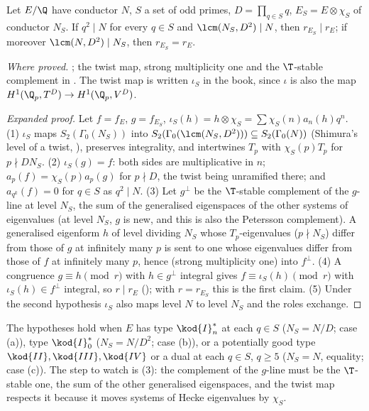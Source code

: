 \begin{sloppypar}
\begin{theorem}\label{thm:paper:twist}
Let $E/\Q$ have conductor $N$, $S$ a set of odd primes, $D=\prod_{q\in S}q$, $E_S=E\otimes\chi_S$ of conductor $N_S$. If $q^2\mid N$ for every $q\in S$ and $\lcm(N_S,D^2)\mid N$, then $r_{E_S}\mid r_E$;
if moreover $\lcm(N,D^2)\mid N_S$, then $r_{E_S}=r_E$.
\end{theorem}

\noindent\emph{Where proved.} ; the twist map, strong multiplicity one and the $\T$-stable complement in . The twist map is written
$\iota_S$ in the book, since $\iota$ is also the map $H^1(\Q_p,T^D)\to H^1(\Q_p,V^D)$.

\begin{proof}[Expanded proof]
Let $f=f_E$, $g=f_{E_S}$, $\iota_S(h)=h\otimes\chi_S=\sum\chi_S(n)a_n(h)q^n$. (1) $\iota_S$ maps $S_2(\Gamma_0(N_S))$ into $S_2(\Gamma_0(\lcm(N_S,D^2)))\subseteq S_2(\Gamma_0(N))$ (Shimura's
level of a twist, ), preserves integrality, and intertwines $T_p$ with $\chi_S(p)T_p$ for $p\nmid DN_S$. (2) $\iota_S(g)=f$: both sides are multiplicative in $n$;
$a_p(f)=\chi_S(p)a_p(g)$ for $p\nmid D$, the twist being unramified there; and $a_{q^k}(f)=0$ for $q\in S$ as $q^2\mid N$. (3) Let $g^\perp$ be the $\T$-stable complement of the $g$-line at
level $N_S$, the sum of the generalised eigenspaces of the other systems of eigenvalues (at level $N_S$, $g$ is new, and this is also the Petersson complement). A
generalised eigenform $h$ of level dividing $N_S$ whose $T_p$-eigenvalues ($p\nmid N_S$) differ from those of $g$ at infinitely many $p$ is sent to one whose eigenvalues differ from
those of $f$ at infinitely many $p$, hence (strong multiplicity one) into $f^\perp$. (4) A congruence $g\equiv h\pmod r$ with $h\in g^\perp$ integral gives $f\equiv\iota_S(h)\pmod r$ with $\iota_S(h)\in f^\perp$
integral, so $r\mid r_E$ (); with $r=r_{E_S}$ this is the first claim. (5) Under the second hypothesis $\iota_S$ also maps level $N$ to level $N_S$ and the roles
exchange.
\end{proof}

\noindent The hypotheses hold when $E$ has type $\kod{I}_n^*$ at each $q\in S$ ($N_S=N/D$; case (a)), type $\kod{I}_0^*$ ($N_S=N/D^2$; case (b)), or a potentially good type
$\kod{II},\kod{III},\kod{IV}$ or a dual at each $q\in S$, $q\ge5$ ($N_S=N$, equality; case (c)). The step to watch is (3): the complement of the $g$-line must be the $\T$-stable one, the
sum of the other generalised eigenspaces, and the twist map respects it because it moves systems of Hecke eigenvalues by $\chi_S$.


\end{sloppypar}
